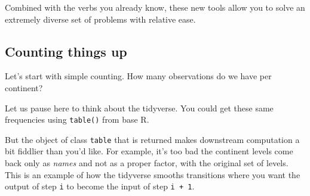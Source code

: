 \documentclass[
]{book}
\newenvironment{Shaded}{\begin{snugshade}}{\end{snugshade}}
\newcommand{\CommentTok}[1]{\textcolor[rgb]{0.56,0.35,0.01}{\textit{#1}}}
\newcommand{\DataTypeTok}[1]{\textcolor[rgb]{0.13,0.29,0.53}{#1}}
\newcommand{\KeywordTok}[1]{\textcolor[rgb]{0.13,0.29,0.53}{\textbf{#1}}}
\newcommand{\NormalTok}[1]{#1}
\newcommand{\OperatorTok}[1]{\textcolor[rgb]{0.81,0.36,0.00}{\textbf{#1}}}
\newcommand{\StringTok}[1]{\textcolor[rgb]{0.31,0.60,0.02}{#1}}
\begin{document}
Combined with the verbs you already know, these new tools allow you to solve an extremely diverse set of problems with relative ease.

\hypertarget{counting-things-up}{%
\subsection{Counting things up}\label{counting-things-up}}

Let's start with simple counting. How many observations do we have per continent?

\begin{Shaded}
\end{Shaded}

Let us pause here to think about the tidyverse. You could get these same frequencies using \texttt{table()} from base R.

\begin{Shaded}
\end{Shaded}

But the object of class \texttt{table} that is returned makes downstream computation a bit fiddlier than you'd like. For example, it's too bad the continent levels come back only as \emph{names} and not as a proper factor, with the original set of levels. This is an example of how the tidyverse smooths transitions where you want the output of step \texttt{i} to become the input of step \texttt{i\ +\ 1}.
\end{document}
